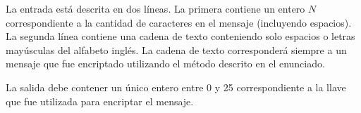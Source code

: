 \documentclass{oci}
\begin{document}
\begin{inputDescription}
    La entrada está descrita en dos líneas.
    La primera contiene un entero $N$ correspondiente a la cantidad de caracteres en el mensaje
    (incluyendo espacios).
    La segunda línea contiene una cadena de texto conteniendo solo espacios o letras mayúsculas
    del alfabeto inglés.
    La cadena de texto corresponderá siempre a un mensaje que fue encriptado utilizando el método
    descrito en el enunciado.

\end{inputDescription}

\begin{outputDescription}
    La salida debe contener un único entero entre 0 y 25 correspondiente a la llave que
    fue utilizada para encriptar el mensaje.
\end{outputDescription}


\begin{sampleDescription}
\end{sampleDescription}
\end{document}
